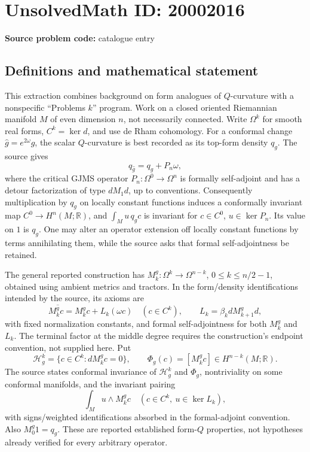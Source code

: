 \documentclass[11pt]{article}
\newcommand{\R}{\mathbb{R}}
\begin{document}
\section*{UnsolvedMath ID: 20002016}
\textbf{Source problem code:} catalogue entry
\subsection{Definitions and mathematical statement}
This extraction combines background on form analogues of \(Q\)-curvature with a nonspecific ``Problems \(k\)'' program. Work on a closed oriented Riemannian manifold \(M\) of even dimension \(n\), not necessarily connected. Write \(\Omega^k\) for smooth real forms, \(C^k=\ker d\), and use de Rham cohomology. For a conformal change \(\widehat g=e^{2\omega}g\), the scalar \(Q\)-curvature is best recorded as its top-form density \(q_g\). The source gives
\[
 q_{\widehat g}=q_g+P_n\omega,
\]
where the critical GJMS operator \(P_n:\Omega^0\to\Omega^n\) is formally self-adjoint and has a detour factorization of type \(dM_1d\), up to conventions. Consequently multiplication by \(q_g\) on locally constant functions induces a conformally invariant map \(C^0\to H^n(M;\R)\), and \(\int_M u\,q_gc\) is invariant for \(c\in C^0\), \(u\in\ker P_n\). Its value on \(1\) is \(q_g\). One may alter an operator extension off locally constant functions by terms annihilating them, while the source asks that formal self-adjointness be retained.

The general reported construction has \(M_k^g:\Omega^k\to\Omega^{n-k}\), \(0\leq k\leq n/2-1\), obtained using ambient metrics and tractors. In the form/density identifications intended by the source, its axioms are
\[
 M_k^{\widehat g}c=M_k^gc+L_k(\omega c)\quad(c\in C^k),\qquad
 L_k=\beta_k dM_{k+1}^gd,
\]
with fixed normalization constants, and formal self-adjointness for both \(M_k^g\) and \(L_k\). The terminal factor at the middle degree requires the construction's endpoint convention, not supplied here. Put
\[
 \mathcal H_g^k=\{c\in C^k:dM_k^gc=0\},\qquad
 \Phi_g(c)=[M_k^gc]\in H^{n-k}(M;\R).
\]
The source states conformal invariance of \(\mathcal H_g^k\) and \(\Phi_g\), nontriviality on some conformal manifolds, and the invariant pairing
\[
 \int_M u\wedge M_k^gc\quad(c\in C^k,\ u\in\ker L_k),
\]
with signs/weighted identifications absorbed in the formal-adjoint convention. Also \(M_0^g1=q_g\). These are reported established form-\(Q\) properties, not hypotheses already verified for every arbitrary operator.
\end{document}
